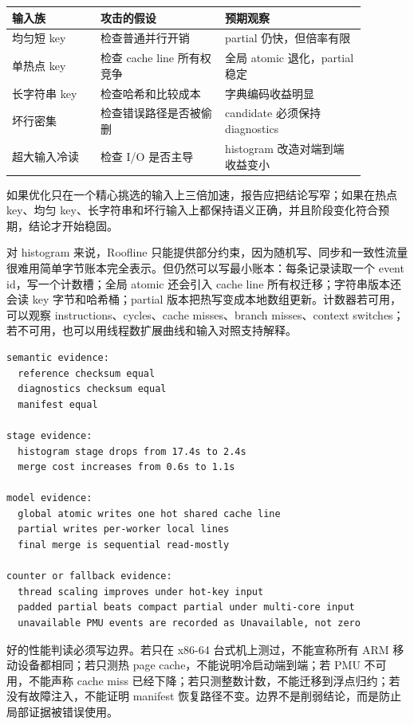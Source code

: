 \begin{center}
\begin{tabular}{p{0.22\linewidth}p{0.31\linewidth}p{0.35\linewidth}}
\toprule
输入族 & 攻击的假设 & 预期观察 \\
\midrule
均匀短 key & 检查普通并行开销 & partial 仍快，但倍率有限 \\
单热点 key & 检查 cache line 所有权竞争 & 全局 atomic 退化，partial 稳定 \\
长字符串 key & 检查哈希和比较成本 & 字典编码收益明显 \\
坏行密集 & 检查错误路径是否被偷删 & candidate 必须保持 diagnostics \\
超大输入冷读 & 检查 I/O 是否主导 & histogram 改造对端到端收益变小 \\
\bottomrule
\end{tabular}
\end{center}

如果优化只在一个精心挑选的输入上三倍加速，报告应把结论写窄；如果在热点 key、均匀 key、长字符串和坏行输入上都保持语义正确，并且阶段变化符合预期，结论才开始稳固。

对 histogram 来说，Roofline 只能提供部分约束，因为随机写、同步和一致性流量很难用简单字节账本完全表示。但仍然可以写最小账本：每条记录读取一个 event id，写一个计数槽；全局 atomic 还会引入 cache line 所有权迁移；字符串版本还会读 key 字节和哈希桶；partial 版本把热写变成本地数组更新。计数器若可用，可以观察 instructions、cycles、cache misses、branch misses、context switches；若不可用，也可以用线程数扩展曲线和输入对照支持解释。

\begin{lstlisting}[numbers=none,caption={histogram 优化的证据链摘要}]
semantic evidence:
  reference checksum equal
  diagnostics checksum equal
  manifest equal

stage evidence:
  histogram stage drops from 17.4s to 2.4s
  merge cost increases from 0.6s to 1.1s

model evidence:
  global atomic writes one hot shared cache line
  partial writes per-worker local lines
  final merge is sequential read-mostly

counter or fallback evidence:
  thread scaling improves under hot-key input
  padded partial beats compact partial under multi-core input
  unavailable PMU events are recorded as Unavailable, not zero
\end{lstlisting}

好的性能判读必须写边界。若只在 x86-64 台式机上测过，不能宣称所有 ARM 移动设备都相同；若只测热 page cache，不能说明冷启动端到端；若 PMU 不可用，不能声称 cache miss 已经下降；若只测整数计数，不能迁移到浮点归约；若没有故障注入，不能证明 manifest 恢复路径不变。边界不是削弱结论，而是防止局部证据被错误使用。

